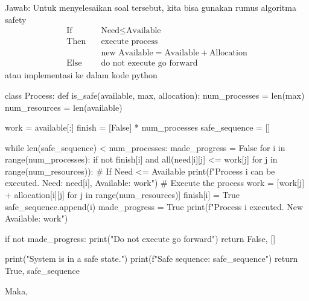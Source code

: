 \documentclass[12pt]{article}
\begin{document}
Jawab:
\break Untuk menyelesaikan soal tersebut, kita bisa gunakan rumus algoritma safety
\begin{align*}
    \text{If} \quad & \text{Need} \leq \text{Available} \\
    \text{Then} \quad & \text{execute process} \\
                    & \text{new Available} = \text{Available} + \text{Allocation} \\
    \text{Else} \quad & \text{do not execute go forward}
\end{align*}
atau implementasi ke dalam kode python
\begin{python}
    class Process:
    def is_safe(available, max, allocation):
    num_processes = len(max)
    num_resources = len(available)

    work = available[:]
    finish = [False] * num_processes
    safe_sequence = []

    while len(safe_sequence) < num_processes:
        made_progress = False
        for i in range(num_processes):
            if not finish[i] and all(need[i][j] <= work[j] for j in range(num_resources)):
                # If Need <= Available
                print(f"Process {i} can be executed. Need: {need[i]}, Available: {work}")
                # Execute the process
                work = [work[j] + allocation[i][j] for j in range(num_resources)]
                finish[i] = True
                safe_sequence.append(i)
                made_progress = True
                print(f"Process {i} executed. New Available: {work}")
        
        if not made_progress:
            print("Do not execute go forward")
            return False, []

    print("System is in a safe state.")
    print(f"Safe sequence: {safe_sequence}")
    return True, safe_sequence
\end{python}

Maka,
\end{document}
